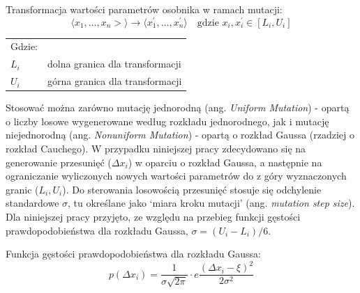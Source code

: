 \documentclass[a4paper,11pt]{article}
\begin{document}
    \bigskip

    \noindent
    \begin{minipage}[H]{\textwidth}
        \setlength\parindent{17pt} Transformacja wartości parametrów osobnika w ramach mutacji: \\
        \begin{equation}
            \label{eq:mutation_transformation}
            \langle x_{1},\dotsc,x_{n}> \rangle \to \langle x_{1}^{'},\dotsc,x_{n}^{'} \rangle \quad \text{gdzie } x_{i}, x_{i}^{'} \in [L_{i}, U_{i}]
        \end{equation}
        \smallskip
        \begin{tabular}{p{}p{}}
            Gdzie: \\
            $L_{i}$ & dolna granica dla transformacji \\
            $U_{i}$ & górna granica dla transformacji \\
        \end{tabular}
    \end{minipage}

    \bigskip

    Stosować można zarówno mutację jednorodną (ang. \textit{Uniform Mutation}) - opartą o liczby losowe wygenerowane według rozkładu jednorodnego, jak i mutację niejednorodną (ang. \textit{Nonuniform Mutation}) - opartą o rozkład Gaussa (rzadziej o rozkład Cauchego)\cite{IntroductionToEvolutionaryComputing2015}. W przypadku niniejszej pracy zdecydowano się na generowanie przesunięć ($\Delta x_{i}$) w oparciu o rozkład Gaussa, a następnie na ograniczanie wyliczonych nowych wartości parametrów do z góry wyznaczonych granic ($L_{i}, U_{i}$). Do sterowania losowością przesunięć stosuje się odchylenie standardowe $\sigma$, tu określane jako `miara kroku mutacji' (ang. \textit{mutation step size}). Dla niniejszej pracy przyjęto, ze względu na przebieg funkcji gęstości prawdopodobieństwa dla rozkładu Gaussa, $\sigma = (U_{i} - L_{i}) / 6$.

    \bigskip

    \noindent
    \begin{minipage}[H]{\textwidth}
        \setlength\parindent{17pt} Funkcja gęstości prawdopodobieństwa dla rozkładu Gaussa: \\
        \begin{equation}
            \label{eq:mutation_probability distribution}
            p(\Delta x_{i}) = \frac{1}{\sigma \sqrt {2 \pi}} \cdot e \frac{(\Delta x_{i} - \xi)^{2}}{2 \sigma^{2}}
        \end{equation}
    \end{minipage}
\end{document}
